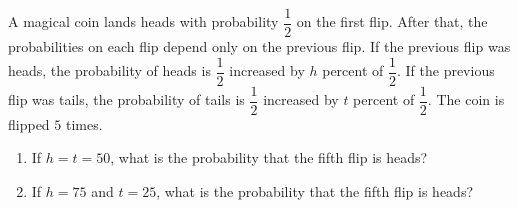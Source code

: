 A magical coin lands heads with probability \(\dfrac{1}{2}\) on the first flip. After that, the probabilities on each flip depend only on the previous flip. If the previous flip was heads, the probability of heads is \(\dfrac{1}{2}\) increased by \(h\) percent of \(\dfrac{1}{2}\). If the previous flip was tails, the probability of tails is \(\dfrac{1}{2}\) increased by \(t\) percent of \(\dfrac{1}{2}\). The coin is flipped \(5\) times.
\begin{enumerate}
\item[(a)] If \(h=t=50\), what is the probability that the fifth flip is heads?
\item[(b)] If \(h=75\) and \(t=25\), what is the probability that the fifth flip is heads?
\end{enumerate}
